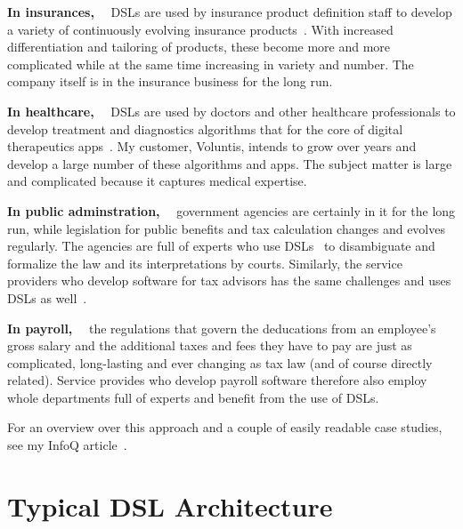 \documentclass[runningheads]{llncs}
\newcommand\parhead[1]{\vspace{1mm}\noindent\textbf{{#1}}\ \ }
\newcommand\todo[1]{}
\begin{document}
\parhead{In insurances,} DSLs are used by insurance product definition staff to
develop a variety of continuously evolving insurance products~\cite{zurich}.
With increased differentiation and tailoring of products, these become more and
more complicated while at the same time increasing in variety and number. The
company itself is in the insurance business for the long run. 

\todo{Reference to
detailed case study coming once MPS book is published}

\parhead{In healthcare,} DSLs are used by doctors and other healthcare
professionals to develop treatment and diagnostics algorithms that for the core
of digital therapeutics apps~\cite{voelter2019vol}. My customer, Voluntis, 
intends to grow over years
and develop a large number of these algorithms and apps. The subject matter is
large and complicated because it captures medical expertise. 

\parhead{In public adminstration,} government agencies are certainly in it for
the long run, while legislation for public benefits and tax calculation changes
and evolves regularly. The agencies are full of experts who use DSLs~\cite{dta} 
to disambiguate and
formalize the law and its interpretations by
courts. Similarly, the service providers who
develop software for tax advisors has the same challenges and uses DSLs as well~\cite{datevsteuervideo,datevsteuerslides}.


\parhead{In payroll,} the regulations that govern the deducations from an
employee's gross salary and the additional taxes and fees they have to pay are
just as complicated, long-lasting and ever changing as tax law (and of course
directly related). Service provides who develop payroll software therefore also
employ whole departments full of experts and benefit from the use of DSLs.
\todo{Reference to detailed case study coming once MPS book is published}

\vspace{3mm}

\noindent For an overview over this approach and a couple of easily readable 
case studies, see my InfoQ article~\cite{infoq}.


\section{Typical DSL Architecture}
\label{langarch}
\end{document}
